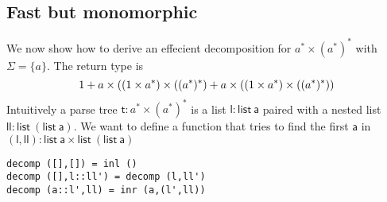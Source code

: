 \documentclass[a4paper,UKenglish,cleveref, autoref, thm-restate]{lipics-v2021}
\newcommand\mycomment[1]{}
\begin{document}
\subsection{Fast but monomorphic}
We now show how to derive an effecient decomposition for $a^* \times (a^*)^*$ with $\Sigma = \{a\}$. The return type is
\[1 + a \times ((1 \times a^*) \times (({a^*})^*) +  a \times ((1 \times a^*) \times (({a^*})^*) )\]
Intuitively a parse tree $\mathsf{t} : a^* \times (a^*)^*$ is a list $\mathsf{l} : \mathsf{list~a}$ paired with a nested list $\mathsf{ll} : \mathsf{list~(list~a)}$. We want to define a function that tries to find the first $\mathsf{a}$ in $(\mathsf{l},\mathsf{ll}) : \mathsf{list~a} \times \mathsf{list~(list~a)}$
\begin{verbatim}
decomp ([],[]) = inl ()
decomp ([],l::ll') = decomp (l,ll')
decomp (a::l',ll) = inr (a,(l',ll))
\end{verbatim}
\end{document}
